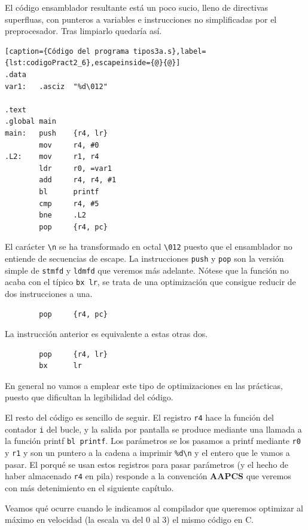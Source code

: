 El código ensamblador resultante está un poco sucio, lleno de directivas superfluas,
con punteros a variables e instrucciones no simplificadas por el preprocesador. Tras
limpiarlo quedaría así.

\begin{lstlisting}[caption={Código del programa tipos3a.s},label={lst:codigoPract2_6},escapeinside={@}{@}]
.data
var1:   .asciz  "%d\012"

.text
.global main
main:   push    {r4, lr}
        mov     r4, #0
.L2:    mov     r1, r4
        ldr     r0, =var1
        add     r4, r4, #1
        bl      printf
        cmp     r4, #5
        bne     .L2
        pop     {r4, pc}
\end{lstlisting}

El carácter {\tt \textbackslash n} se ha transformado en octal {\tt \textbackslash 012} puesto que el ensamblador
no entiende de secuencias de escape. La instrucciones {\tt push} y {\tt pop} son la versión
simple de {\tt stmfd} y {\tt ldmfd} que veremos más adelante. Nótese que la función no acaba
con el típico {\tt bx lr}, se trata de una optimización que consigue reducir de dos
instrucciones a una.

\begin{lstlisting}
        pop     {r4, pc}
\end{lstlisting}

La instrucción anterior es equivalente a estas otras dos.

\begin{lstlisting}
        pop     {r4, lr}
        bx      lr
\end{lstlisting}

En general no vamos a emplear este tipo de optimizaciones en las prácticas, puesto que
dificultan la legibilidad del código.

El resto del código es sencillo de seguir. El registro {\tt r4} hace la función del
contador {\tt i} del bucle, y la salida por pantalla se produce mediante una llamada
a la función printf {\tt bl printf}. Los parámetros se los pasamos a printf mediante
{\tt r0} y {\tt r1} y son un puntero a la cadena a imprimir {\tt \%d\textbackslash n}
y el entero que le vamos a pasar. El porqué se usan estos registros para pasar
parámetros (y el hecho de
haber almacenado {\tt r4} en pila) responde a la convención {\bf AAPCS} que
veremos con más detenimiento en el siguiente capítulo.

Veamos qué ocurre cuando le indicamos al compilador que queremos optimizar al
máximo en velocidad (la escala va del 0 al 3) el mismo código en C.

